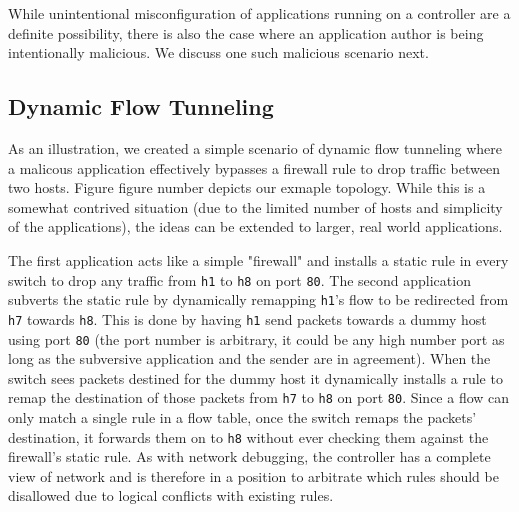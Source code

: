 
While unintentional misconfiguration of applications running on a controller are a definite possibility, there is also the case where an application author is being intentionally malicious.
We discuss one such malicious scenario next.

\subsection{Dynamic Flow Tunneling}
As an illustration, we created a simple scenario of dynamic flow tunneling where a malicous application effectively bypasses a firewall rule to drop traffic between two hosts.
Figure {figure number} depicts our exmaple topology.
While this is a somewhat contrived situation (due to the limited number of hosts and simplicity of the applications), the ideas can be extended to larger, real world applications.

The first application acts like a simple "firewall" and installs a static rule in every switch to drop any traffic from \texttt{h1} to \texttt{h8} on port \texttt{80}.
The second application subverts the static rule by dynamically remapping \texttt{h1}'s flow to be redirected from \texttt{h7} towards \texttt{h8}.
This is done by having \texttt{h1} send packets towards a dummy host using port \texttt{80} (the port number is arbitrary, it could be any high number port as long as the subversive application and the sender are in agreement).
When the switch sees packets destined for the dummy host it dynamically installs a rule to remap the destination of those packets from \texttt{h7} to \texttt{h8} on port \texttt{80}.
Since a flow can only match a single rule in a flow table, once the switch remaps the packets' destination, it forwards them on to \texttt{h8} without ever checking them against the firewall's static rule.
As with network debugging, the controller has a complete view of network and is therefore in a position to arbitrate which rules should be disallowed due to logical conflicts with existing rules.


